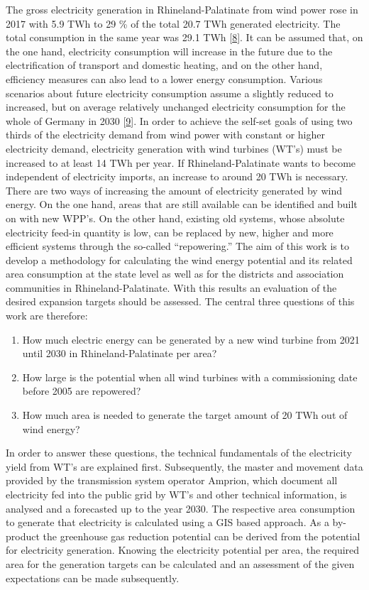 \documentclass[a4paper,11pt]{article}
\begin{document}
The gross electricity generation in Rhineland-Palatinate from wind power rose in 2017 with 5.9 TWh to 29 \% of the total 20.7 TWh generated electricity. The total consumption in the same year was 29.1 TWh {[}\protect\hyperlink{ref-Lehnert.2020}{8}{]}. It can be assumed that, on the one hand, electricity consumption will increase in the future due to the electrification of transport and domestic heating, and on the other hand, efficiency measures can also lead to a lower energy consumption. Various scenarios about future electricity consumption assume a slightly reduced to increased, but on average relatively unchanged electricity consumption for the whole of Germany in 2030 {[}\protect\hyperlink{ref-NormanGerhardt.2015}{9}{]}. In order to achieve the self-set goals of using two thirds of the electricity demand from wind power with constant or higher electricity demand, electricity generation with wind turbines (WT's) must be increased to at least 14 TWh per year. If Rhineland-Palatinate wants to become independent of electricity imports, an increase to around 20 TWh is necessary. There are two ways of increasing the amount of electricity generated by wind energy. On the one hand, areas that are still available can be identified and built on with new WPP's. On the other hand, existing old systems, whose absolute electricity feed-in quantity is low, can be replaced by new, higher and more efficient systems through the so-called ``repowering.''
The aim of this work is to develop a methodology for calculating the wind energy potential and its related area consumption at the state level as well as for the districts and association communities in Rhineland-Palatinate. With this results an evaluation of the desired expansion targets should be assessed. The central three questions of this work are therefore:
\begin{enumerate}
\def\labelenumi{\arabic{enumi}.}
\item
  How much electric energy can be generated by a new wind turbine from 2021 until 2030 in Rhineland-Palatinate per area?
\item
  How large is the potential when all wind turbines with a commissioning date before 2005 are repowered?
\item
  How much area is needed to generate the target amount of 20 TWh out of wind energy?
\end{enumerate}
In order to answer these questions, the technical fundamentals of the electricity yield from WT's are explained first. Subsequently, the master and movement data provided by the transmission system operator Amprion, which document all electricity fed into the public grid by WT's and other technical information, is analysed and a forecasted up to the year 2030. The respective area consumption to generate that electricity is calculated using a GIS based approach. As a by-product the greenhouse gas reduction potential can be derived from the potential for electricity generation. Knowing the electricity potential per area, the required area for the generation targets can be calculated and an assessment of the given expectations can be made subsequently.
\end{document}
